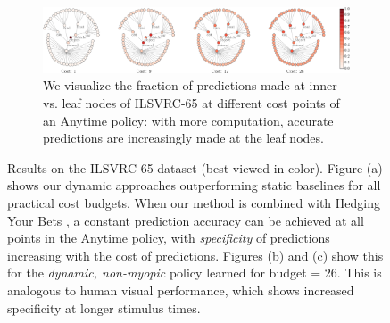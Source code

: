 \begin{figure}[ht]
\begin{subfigure}[b]{0.43\textwidth}
{            \label{fig:imagenet-b}
            }
    \end{subfigure}\\\vspace{1em}
    \begin{subfigure}[b]{.97\textwidth}
            \includegraphics[width=\textwidth]{../../figures/apr11_assembly/ilsvrc65_network-crop.pdf}
            \caption{
            We visualize the fraction of predictions made at inner vs. leaf nodes of ILSVRC-65 at different cost points of an Anytime policy: with more computation, accurate predictions are increasingly made at the leaf nodes.
            \label{fig:imagenet-c}
            }
    \end{subfigure}

\caption{
Results on the ILSVRC-65 dataset (best viewed in color).
Figure (a) shows our dynamic approaches outperforming static baselines for all practical cost budgets.
When our method is combined with Hedging Your Bets \parencite{Deng-CVPR-2012}, a constant prediction accuracy can be achieved at all points in the Anytime policy, with \emph{specificity} of predictions increasing with the cost of predictions.
Figures (b) and (c) show this for the \emph{dynamic, non-myopic} policy learned for budget = 26.
This is analogous to human visual performance, which shows increased specificity at longer stimulus times.
\label{fig:imagenet}}
\end{figure}
